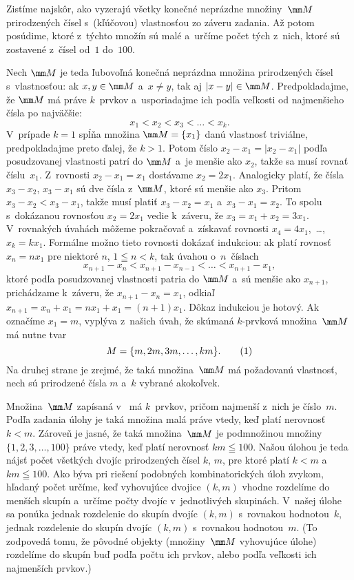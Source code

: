 ﻿{%
Zistíme najskôr, ako vyzerajú všetky konečné neprázdne množiny~$\mm M$
prirodzených čísel s~(kľúčovou) vlastnosťou zo záveru zadania.
Až potom posúdime, ktoré z~týchto množín sú malé a~určíme
počet tých z~nich, ktoré sú zostavené z~čísel od~$1$ do~$100$.

Nech $\mm M$ je teda ľubovoľná konečná neprázdna množina prirodzených
čísel s~vlastnosťou: ak $x,y\in\mm M$ a~$x\ne y$, tak 
aj $|x-y|\in\mm M$. Predpokladajme, že $\mm M$ má práve $k$~prvkov a~usporiadajme ich
podľa veľkosti od najmenšieho čísla po najväčšie:
$$
x_1<x_2<x_3<\dots<x_k.
$$
V~prípade $k=1$ spĺňa množina $\mm M=\{x_1\}$ danú vlastnosť
triviálne, predpokladajme preto ďalej, že $k>1$. Potom číslo
$x_2-x_1=|x_2-x_1|$ podľa posudzovanej vlastnosti patrí do $\mm M$
a~je menšie ako $x_2$, takže sa musí rovnať číslu~$x_1$.
Z~rovnosti $x_2-x_1=x_1$ dostávame $x_2=2x_1$. Analogicky platí, že
čísla $x_3-x_2$, $x_3-x_1$ sú dve čísla z~$\mm M$, ktoré sú
menšie ako $x_3$. Pritom $x_3-x_2<x_3-x_1$, takže musí platiť
$x_3-x_2=x_1$ a~$x_3-x_1=x_2$. To
spolu s~dokázanou rovnosťou $x_2=2x_1$ vedie k~záveru, že
$x_3=x_1+x_2=3x_1$. V~rovnakých úvahách môžeme pokračovať 
a~získavať rovnosti $x_4=4x_1$,~\dots, $x_k=kx_1$. Formálne možno
tieto rovnosti dokázať indukciou: ak platí rovnosť $x_n=nx_1$ pre
niektoré $n$, $1\leqq n<k$, tak úvahou o~$n$~číslach
$$
x_{n+1}-x_n<x_{n+1}-x_{n-1}<\dots<x_{n+1}-x_1,
$$
ktoré podľa posudzovanej vlastnosti patria do $\mm M$ a~sú menšie ako
$x_{n+1}$, prichádzame k~záveru, že $x_{n+1}-x_n=x_1$, odkiaľ
$x_{n+1}=x_n+x_1=nx_1+x_1=(n+1)x_1$. Dôkaz indukciou je hotový.
Ak označíme $x_1=m$, vyplýva z~našich úvah, že skúmaná $k$-prvková
množina~$\mm M$ má nutne tvar
$$
M=\{m,2m,3m,\dots,km\}.                       \tag1
$$
Na druhej strane je zrejmé, že taká množina~$\mm M$ má požadovanú
vlastnosť, nech sú prirodzené čísla $m$ a~$k$ vybrané akokoľvek.

Množina~$\mm M$ zapísaná v~ má $k$~prvkov, pričom najmenší
z~nich je číslo~$m$. Podľa zadania úlohy je taká množina malá
práve vtedy, keď platí nerovnosť $k<m$. Zároveň je jasné, že taká
množina~$\mm M$ je podmnožinou množiny $\{1,2,3,\dots,100\}$
práve vtedy, keď platí nerovnosť $km\leqq 100$. Našou úlohou je teda
nájsť počet všetkých dvojíc prirodzených čísel $k$, $m$, pre ktoré
platí $k<m$ a~$km\leqq100$. Ako býva pri riešení podobných
kombinatorických úloh zvykom, hľadaný počet určíme, keď
vyhovujúce dvojice $(k,m)$ vhodne rozdelíme do menších skupín
a~určíme počty dvojíc v~jednotlivých skupinách. V~našej úlohe sa
ponúka jednak rozdelenie do skupín dvojíc $(k,m)$ s~rovnakou
hodnotou~$k$, jednak rozdelenie do skupín dvojíc $(k,m)$ s~rovnakou
hodnotou~$m$. (To zodpovedá tomu, že pôvodné objekty
(množiny~$\mm M$ vyhovujúce úlohe) rozdelíme do skupín buď podľa
počtu ich prvkov, alebo podľa veľkosti ich najmenších
prvkov.)

}
